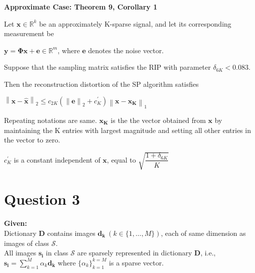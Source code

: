 \documentclass[fleqn, 11pt]{article}
\newcommand{\bs}[1]{\boldsymbol{#1}}
\newcommand\norm[1]{\left\lVert#1\right\rVert}
\newcommand{\R}[0]{\mathbb{R}}
\begin{document}
\smallskip

\hrulefill

\medskip


\textbf{Approximate Case: Theorem 9, Corollary 1} 

\smallskip

Let $\bs{x} \in \R^k$ be an approximately K-sparse signal, and let
its corresponding measurement be 

$\bs{y = \Phi x + e}  \in \R^m$, where $\bs{e}$  denotes the noise vector.

\smallskip

Suppose that the sampling matrix satisfies
the RIP with parameter $\delta_{6K} < 0.083 $.  

\smallskip

Then the reconstruction distortion of the SP algorithm satisfies
\begin{center}
    $\norm{\bs{x - \hat{x}}}_2 \leq c_{2K} (\norm{\bs{e}}_2 + c^{'}_{K}  ) \norm{\bs{x - x_K}}_1 $
\end{center}

Repeating notations are same. $\bs{x_K}$ is the the vector obtained from $\bs{x}$ by maintaining the
K entries with largest magnitude and setting all other entries
in the vector to zero.

\smallskip

$c^{'}_{K}$ is a constant independent of $\bs{x}$, equal to $\sqrt{\dfrac{1+\delta_{6K}}{K}}$

\hrulefill

\newpage
\section*{Question 3}
\setcounter{equation}{0}

\textbf{Given:} \\
Dictionary $\boldsymbol{D}$ contains images $\boldsymbol{d_k} \ (k \in \{1, \dots, M\})$, each of same dimension as images of class $\mathcal{S}$. \\
All images $\boldsymbol{s_i}$ in class $\mathcal{S}$ are sparsely represented in dictionary $\boldsymbol{D}$, i.e., $\boldsymbol{s_i} = \sum_{k=1}^{M} \alpha_k \boldsymbol{d_k}$ where $\{\alpha_k\}_{k=1}^{k=M}$ is a sparse vector. \\

\medskip
\end{document}
